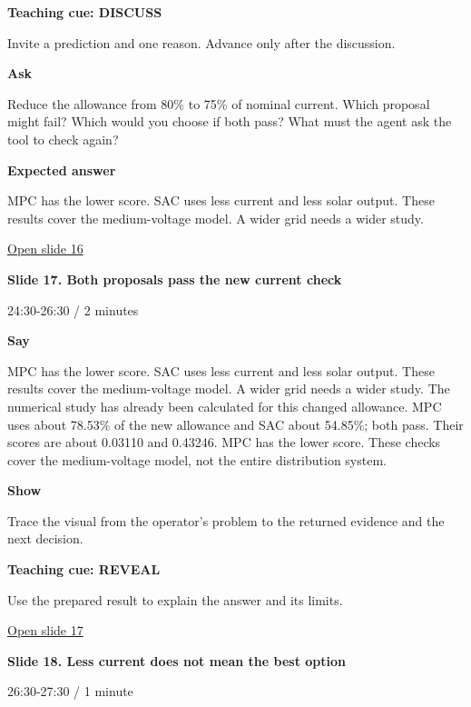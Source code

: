\documentclass[12pt,letterpaper]{article}
\begin{document}
\textbf{Teaching cue: DISCUSS}\par Invite a prediction and one reason. Advance only after the discussion.\par\medskip
\textbf{Ask}\par Reduce the allowance from 80\% to 75\% of nominal current. Which proposal might fail? Which would you choose if both pass? What must the agent ask the tool to check again?\par\textbf{Expected answer}\par MPC has the lower score. SAC uses less current and less solar output. These results cover the medium-voltage model. A wider grid needs a wider study.\par\medskip
\vfill\href{https://alaaselim-sudo.github.io/GridGuard-Agentic-AI-Tutorials/operator-cases/#/16}{Open slide 16}\par
\clearpage{}
{\Large\bfseries\color{IEEEBlue} Slide 17. Both proposals pass the new current check\par}\medskip
{\small\color{Slate} 24:30-26:30 /\allowbreak{} 2 minutes\par}\medskip
\textbf{Say}\par MPC has the lower score. SAC uses less current and less solar output. These results cover the medium-voltage model. A wider grid needs a wider study. The numerical study has already been calculated for this changed allowance. MPC uses about 78.53\% of the new allowance and SAC about 54.85\%; both pass. Their scores are about 0.03110 and 0.43246. MPC has the lower score. These checks cover the medium-voltage model, not the entire distribution system.\par\medskip
\textbf{Show}\par Trace the visual from the operator's problem to the returned evidence and the next decision.\par\medskip
\textbf{Teaching cue: REVEAL}\par Use the prepared result to explain the answer and its limits.\par\medskip
\vfill\href{https://alaaselim-sudo.github.io/GridGuard-Agentic-AI-Tutorials/operator-cases/#/17}{Open slide 17}\par
\clearpage{}
{\Large\bfseries\color{IEEEBlue} Slide 18. Less current does not mean the best option\par}\medskip
{\small\color{Slate} 26:30-27:30 /\allowbreak{} 1 minute\par}\medskip
\end{document}

